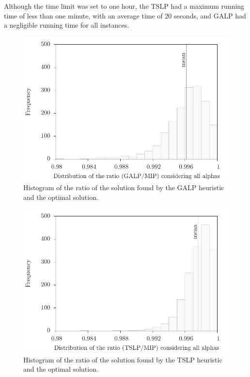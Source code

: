 Although the time limit was set to one hour, the TSLP had a maximum running time of less than one minute, with an average time of 20 seconds, and GALP had a negligible running time for all instances.

\begin{figure}
\centering
\includegraphics[scale=0.7, trim=1cm 0 0 0]{imgs/lpgavsmip.pdf}
\caption{Histogram of the ratio of the solution found by the GALP heuristic and the optimal solution.}
\label{fig:lpgavsmip}
\end{figure}

\begin{figure}
\centering
\includegraphics[scale=0.7, trim=1cm 0 0 0]{imgs/lptsvsmip.pdf}
\caption{Histogram of the ratio of the solution found by the TSLP heuristic and the optimal solution.}
\label{fig:lptsvsmip}
\end{figure}


